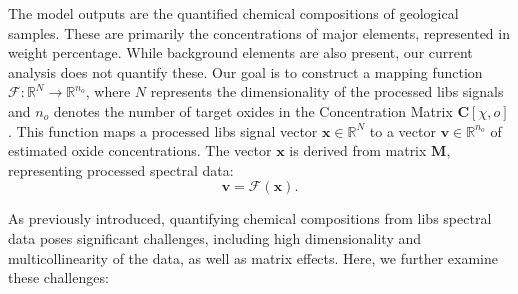 The model outputs are the quantified chemical compositions of geological samples. 
These are primarily the concentrations of major elements, represented in weight percentage. 
While background elements are also present, our current analysis does not quantify these. 
Our goal is to construct a mapping function $\mathcal{F}: \mathbb{R}^N \rightarrow \mathbb{R}^{n_o}$, where $N$ represents the dimensionality of the processed \gls{libs} signals and $n_o$ denotes the number of target oxides in the Concentration Matrix $\mathbf{C}[\chi, o]$.
This function maps a processed \gls{libs} signal vector $\mathbf{x} \in \mathbb{R}^N$ to a vector $\mathbf{v} \in \mathbb{R}^{n_o}$ of estimated oxide concentrations. The vector $\mathbf{x}$ is derived from matrix $\mathbf{M}$, representing processed spectral data:
\[
\mathbf{v} = \mathcal{F}(\mathbf{x}).
\]

As previously introduced, quantifying chemical compositions from \gls{libs} spectral data poses significant challenges, including high dimensionality and multicollinearity of the data, as well as matrix effects. Here, we further examine these challenges:

